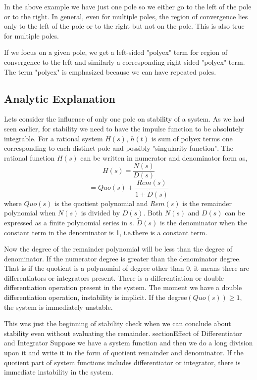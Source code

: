 In the above example we have just one pole so we either go to the left of the pole or to the right. In general, even for multiple poles, the region of convergence lies only to the left of the pole or to the right but not on the pole. This is also true for multiple poles.

If we focus on a given pole, we get a left-sided "polyex" term for region of convergence to the left and similarly a corresponding right-sided "polyex" term. The term "polyex" is emphasized because we can have repeated poles.

\subsection{Analytic Explanation}
Lets consider the influence of only one pole on stability of a system. As we had seen earlier, for stability we need to have the impulse function to be absolutely integrable. For a rational system $H(s)$, $h(t)$ is sum of polyex terms one corresponding to each distinct pole and possibly "singularity function". The rational function $H(s)$ can be written in numerator and denominator form as,
\[
H(s) = \frac{N(s)}{D(s)}
\]
\[
 = Quo(s) + \frac{Rem(s)}{1 + \tilde{D}(s)}
\]
where $Quo(s)$ is the quotient polynomial and $Rem(s)$ is the remainder polynomial when $N(s)$ is divided by $D(s)$. Both $N(s)$ and $D(s)$ can be expressed as a finite polynomial series in s.   
$\tilde{D}(s)$ is the denominator when the constant term in the denominator is 1, i.e.there is a constant term.

Now the degree of the remainder polynomial will be less than the degree of denominator. If the numerator degree is greater than the denominator degree. That is if the quotient is a polynomial of degree other than 0, it means there are differentiators or integrators present. There is a differentiation or double differentiation operation present in the system. The moment we have a double differentiation operation, instability is implicit. If the degree$(Quo(s)) \geq 1$, the system is immediately unstable.

This was just the beginning of stability check when we can conclude about stability even without evaluating the remainder. 
section{Effect of Differentiator and Integrator}
Suppose we have a system function and then we do a long division upon it and write it in the form of quotient remainder and denominator. If the quotient part of system functions includes differentiator or integrator, there is immediate instability in the system.

